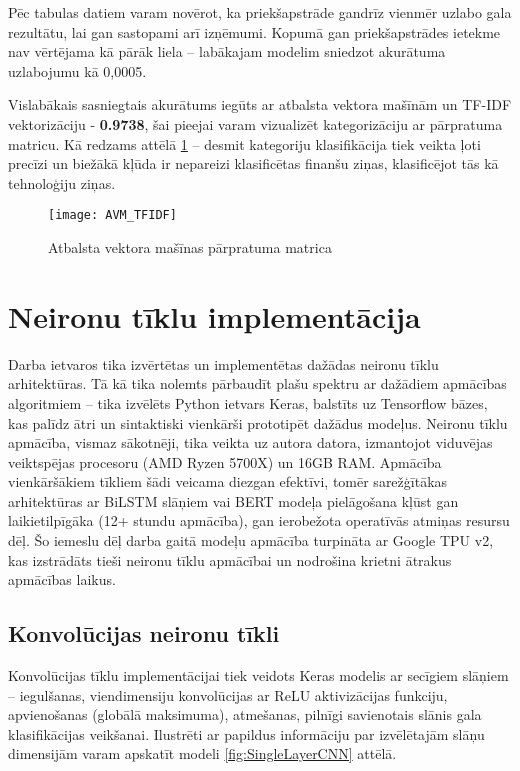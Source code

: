 Pēc tabulas datiem varam novērot, ka priekšapstrāde gandrīz vienmēr uzlabo gala rezultātu, lai gan sastopami arī izņēmumi. Kopumā gan priekšapstrādes ietekme nav vērtējama kā pārāk liela – labākajam modelim sniedzot akurātuma uzlabojumu kā 0,0005. 

Vislabākais sasniegtais akurātums iegūts ar atbalsta vektora mašīnām un TF-IDF vektorizāciju - \textbf{0.9738}, šai pieejai varam vizualizēt kategorizāciju ar pārpratuma matricu. Kā redzams attēlā \ref{fig:AVM_TFIDF} – desmit  kategoriju klasifikācija tiek veikta ļoti precīzi un biežākā kļūda ir nepareizi klasificētas finanšu ziņas, klasificējot tās kā tehnoloģiju ziņas.

\begin{figure}[H]
	\centering
	\texttt{[image: AVM\_TFIDF]}
	\caption{Atbalsta vektora mašīnas pārpratuma matrica}
	\label{fig:AVM_TFIDF}
\end{figure}

\pagebreak
\section{Neironu tīklu implementācija}

Darba ietvaros tika izvērtētas un implementētas dažādas neironu tīklu arhitektūras. Tā kā tika nolemts pārbaudīt plašu spektru ar dažādiem apmācības algoritmiem – tika izvēlēts Python ietvars Keras, balstīts uz Tensorflow bāzes, kas palīdz ātri un sintaktiski vienkārši prototipēt dažādus modeļus. Neironu tīklu apmācība, vismaz sākotnēji, tika veikta uz autora datora, izmantojot viduvējas veiktspējas procesoru (AMD Ryzen 5700X) un 16GB RAM. Apmācība vienkāršākiem tīkliem šādi veicama diezgan efektīvi, tomēr sarežģītākas arhitektūras ar BiLSTM slāņiem vai BERT modeļa pielāgošana kļūst gan laikietilpīgāka (12+ stundu apmācība), gan ierobežota operatīvās atmiņas resursu dēļ. Šo iemeslu dēļ darba gaitā modeļu apmācība turpināta ar Google TPU v2, kas izstrādāts tieši neironu tīklu apmācībai un nodrošina krietni ātrakus apmācības laikus.

\subsection{Konvolūcijas neironu tīkli}
Konvolūcijas tīklu implementācijai tiek veidots Keras modelis ar secīgiem slāņiem – iegulšanas, viendimensiju konvolūcijas ar ReLU aktivizācijas funkciju, apvienošanas (globālā maksimuma), atmešanas, pilnīgi savienotais slānis gala klasifikācijas veikšanai. Ilustrēti ar papildus informāciju par izvēlētajām slāņu dimensijām varam apskatīt modeli \ref{fig:SingleLayerCNN} attēlā.

